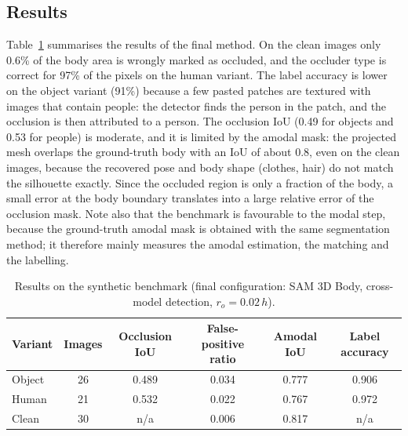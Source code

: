 \documentclass[pdflatex,sn-mathphys-num]{sn-jnl}%
\begin{document}
\subsection{Results}
Table~\ref{tab:synthetic} summarises the results of the final method. On the clean images only 0.6\% of the body area is wrongly marked as occluded, and the occluder type is correct for 97\% of the pixels on the human variant. The label accuracy is lower on the object variant (91\%) because a few pasted patches are textured with images that contain people: the detector finds the person in the patch, and the occlusion is then attributed to a person. The occlusion IoU (0.49 for objects and 0.53 for people) is moderate, and it is limited by the amodal mask: the projected mesh overlaps the ground-truth body with an IoU of about 0.8, even on the clean images, because the recovered pose and body shape (clothes, hair) do not match the silhouette exactly. Since the occluded region is only a fraction of the body, a small error at the body boundary translates into a large relative error of the occlusion mask. Note also that the benchmark is favourable to the modal step, because the ground-truth amodal mask is obtained with the same segmentation method; it therefore mainly measures the amodal estimation, the matching and the labelling.


\begin{table}[!h]
  \centering
  \caption{Results on the synthetic benchmark (final configuration: SAM 3D Body, cross-model detection, $r_o=0.02\,h$).}
  \label{tab:synthetic}
  \begin{tabular}{lccccc}
    \toprule
    Variant & Images & Occlusion IoU & False-positive ratio & Amodal IoU & Label accuracy \\
    \midrule
    Object & 26 & 0.489 & 0.034 & 0.777 & 0.906 \\
    Human  & 21 & 0.532 & 0.022 & 0.767 & 0.972 \\
    Clean  & 30 & n/a & 0.006 & 0.817 & n/a \\
    \bottomrule
  \end{tabular}
\end{table}
\end{document}
